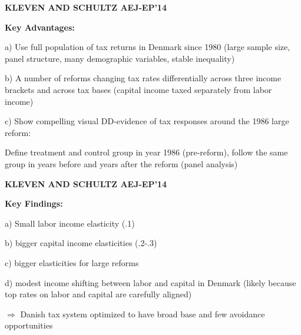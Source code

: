 \documentclass[landscape]{slides}
\begin{document}
\begin{slide}
\begin{center}
{\bf KLEVEN AND SCHULTZ AEJ-EP'14}
\end{center}
\textbf{Key Advantages:} 

a) Use full population of tax returns in Denmark since 1980 
(large sample size, panel structure, many demographic variables, stable inequality)

b) A number of reforms changing tax rates differentially across three income
brackets and across tax bases (capital income taxed separately from labor income)

c) Show compelling visual DD-evidence of tax responses around the 1986 large reform:

Define treatment and control group in year 1986 (pre-reform), follow the same group in years before and years after
the reform (panel analysis)

\end{slide}

\begin{slide}

\end{slide}

\begin{slide}
\begin{center}
{\bf KLEVEN AND SCHULTZ AEJ-EP'14}
\end{center}

\textbf{Key Findings:} 

a) Small labor income elasticity (.1)

b) bigger capital income elasticities (.2-.3)

c) bigger elasticities for large reforms

d) modest income shifting between labor and capital in Denmark
(likely because top rates on labor and capital are carefully aligned)

$\Rightarrow$ Danish tax system
optimized to have broad base and few avoidance opportunities

\end{slide}


%
%
%
%
%
%
%
%
%
\end{document}
